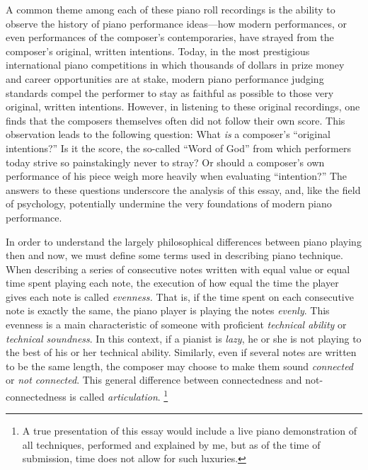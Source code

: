 \documentclass[titlepage,14pt]{article}
\begin{document}
\begin{doublespace}
A common theme among each of these piano roll recordings is the ability to observe the history of piano performance ideas---how modern performances, or even performances of the composer's contemporaries, have strayed from the composer's original, written intentions. Today, in the most prestigious international piano competitions in which thousands of dollars in prize money and career opportunities are at stake, \autocite{vancliburn} modern piano performance judging standards compel the performer to stay as faithful as possible to those very original, written intentions. \autocite{intentions} However, in listening to these original recordings, one finds that the composers themselves often did not follow their own score. This observation leads to the following question: What \textit{is} a composer's ``original intentions?'' Is it the score, the so-called ``Word of God'' from which performers today strive so painstakingly never to stray? Or should a composer's own performance of his piece weigh more heavily when evaluating ``intention?'' The answers to these questions underscore the analysis of this essay, and, like the field of psychology, \autocite{foundationpsychology} potentially undermine the very foundations of modern piano performance.

In order to understand the largely philosophical differences between piano playing then and now, we must define some terms used in describing piano technique. When describing a series of consecutive notes written with equal value or equal time spent playing each note, the execution of how equal the time the player gives each note is called \textit{evenness.} That is, if the time spent on each consecutive note is exactly the same, the piano player is playing the notes \textit{evenly}. This evenness is a main characteristic of someone with proficient \textit{technical ability} or \textit{technical soundness}. In this context, if a pianist is \textit{lazy}, he or she is not playing to the best of his or her technical ability. Similarly, even if several notes are written to be the same length, the composer may choose to make them sound \textit{connected} or \textit{not connected}. This general difference between connectedness and not-connectedness is called \textit{articulation}. \footnote{A true presentation of this essay would include a live piano demonstration of all techniques, performed and explained by me, but as of the time of submission, time does not allow for such luxuries.}


\end{doublespace}
\end{document}

